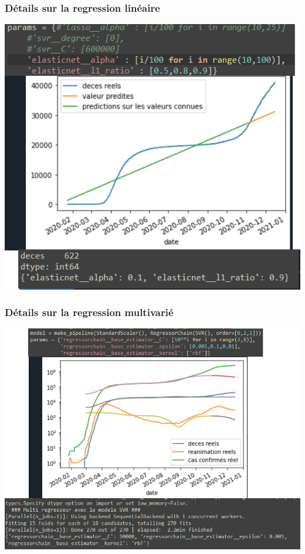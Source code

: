 \documentclass{beamer}[aspectratio = 43]
\begin{document}
\begin{frame}
	\frametitle{Détails sur la regression linéaire}
	\centering
	\includegraphics[scale=0.4]{EN_old}
\end{frame}

\begin{frame}
	\frametitle{Détails sur la regression multivarié}
	\centering
	\includegraphics[scale=0.5]{Multi_regresseur}
\end{frame}
\end{document}
